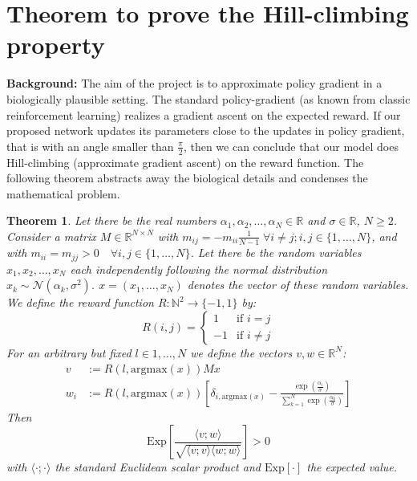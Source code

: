 \documentclass{article}
\newtheorem{theorem}{Theorem}
\theoremstyle{remark}
\begin{document}
\section*{Theorem to prove the Hill-climbing property}

\textbf{Background:} The aim of the project is to approximate policy gradient in a biologically plausible setting.
The standard policy-gradient (as known from classic reinforcement learning) realizes a gradient ascent on the expected reward.
If our proposed network updates its parameters close to the updates in policy gradient, that is with an angle smaller than $\frac{\pi}{2}$, then we can conclude that our model does Hill-climbing (approximate gradient ascent) on the reward function.
The following theorem abstracts away the biological details and condenses the mathematical problem.

\begin{theorem}
Let there be the real numbers $\alpha_1, \alpha_2, \dots ,\alpha_N \in \mathbb{R}$ and $\sigma \in \mathbb{R}$, $N \geq 2$.
Consider a matrix $M \in \mathbb{R}^{N\times N}$ with $m_{ij} = - m_{ii} \frac{1}{N-1} \; \forall i \neq j; i,j \in \{1,\dots,N\}$, and with $m_{ii} = m_{jj} > 0 \quad \forall i,j \in \{1,\dots,N\}$.
Let there be the random variables $x_1, x_2, \dots , x_N$ each independently following the normal distribution $x_k \sim \mathcal{N}(\alpha_k, \sigma^2)$.
$x = (x_1, \dots, x_N)$ denotes the vector of these random variables.
We define the reward function $R: \mathbb{N}^2 \to \{-1,1\}$ by:
    \begin{equation}
         R(i,j) = 
          \begin{cases} 
           1 & \text{if } i = j\\
           -1       & \text{if } i \neq j
          \end{cases}
    \end{equation}
For an arbitrary but fixed $l \in {1,\dots,N}$ we define the vectors $v,w \in \mathbb{R}^N$:
    \begin{align}
        v &:= R(l, \mathrm{argmax}(x)) M x\\
        w_i &:= R(l, \mathrm{argmax}(x)) \left[\delta_{i, \mathrm{argmax}(x)} - \frac{\exp(\frac{\alpha_i}{\sigma})}{\sum_{k=1}^{N}\exp(\frac{\alpha_k}{\sigma})}\right] 
    \end{align}
Then
    \begin{equation}
        \mathrm{Exp} \left [ \frac{\langle v; w \rangle}{\sqrt{\langle v; v\rangle \langle w;w \rangle}} \right] > 0
    \end{equation}
with $\langle \cdot ; \cdot \rangle$ the standard Euclidean scalar product and $\mathrm{Exp}[ \cdot]$ the expected value.
\end{theorem}
\end{document}
